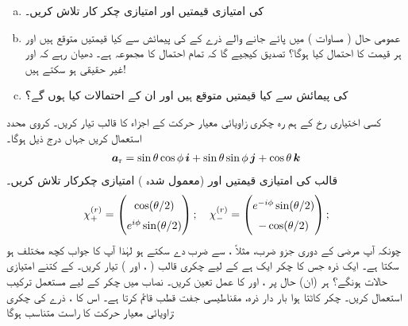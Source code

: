  \begin{enumerate}[a.]
\item
  کی  امتیازی قیمتیں اور امتیازی چکر کار تلاش کریں۔
\item
 عمومی حال ( مساوات ) میں پائے جانے والے ذرے کے  کی پیمائش سے کیا قیمتیں متوقع ہیں اور ہر قیمت کا احتمال کیا ہوگا؟ تصدیق کیجیے گا کہ تمام احتمال کا مجموعہ  ہے۔ دھیان رہے کہ  اور  غیر حقیقی ہو سکتے ہیں! 
\item
  کی پیمائش سے کیا قیمتیں متوقع ہیں اور ان کے احتمالات کیا ہوں گے؟ 
\end{enumerate}
کسی اختیاری رخ  کے ہم رہ چکری زاویائی معیار حرکت کے اجزاء کا قالب  تیار کریں۔ کروی محدد استعمال کریں جہاں درج ذیل ہوگا۔
\begin{align}
{\boldsymbol{a}}_{\textup{r}}= \sin\theta \cos\phi\, {\boldsymbol{i}} + \sin\theta \sin\phi \, {\boldsymbol{j}} + \cos\theta \, {\boldsymbol{k}}
\end{align}
 قالب  کی امتیازی قیمتیں اور (معمول شدہ ) امتیازی چکرکار تلاش کریں۔ 
\begin{align}
\renewcommand{\arraystretch}{1.5}
\chi_{+}^{(r)} = \begin{pmatrix} \cos(\theta/2)\\ e^{i\phi}\sin(\theta/2)\end{pmatrix};
\quad
\chi_{-}^{(r)} = \begin{pmatrix} e^{-i\phi}\sin(\theta/2)\\ -\cos(\theta/2)\end{pmatrix};
\end{align}
چونکہ آپ مرضی کے دوری جزو ضرب، مثلاً ، سے ضرب دے سکتے ہو لہٰذا آپ کا جواب کچھ مختلف ہو سکتا ہے۔ 
ایک ذرہ جس کا چکر ایک  ہے کے لیے چکری قالب ( ،  اور ) تیار کریں۔  
کے کتنے امتیازی حالات ہونگے؟ ہر (ان) حال پر ،  اور  کا عمل تعین کریں۔ نصاب میں  چکر کے لیے مستعمل ترکیب استعمال کریں۔
 چکر کاٹتا ہوا بار دار ذرہ، مقناطیسی جفت قطب قائم کرتا ہے۔ اس کا  ، ذرے کی چکری زاویائی معیار حرکت  کا راست متناسب ہوگا:
